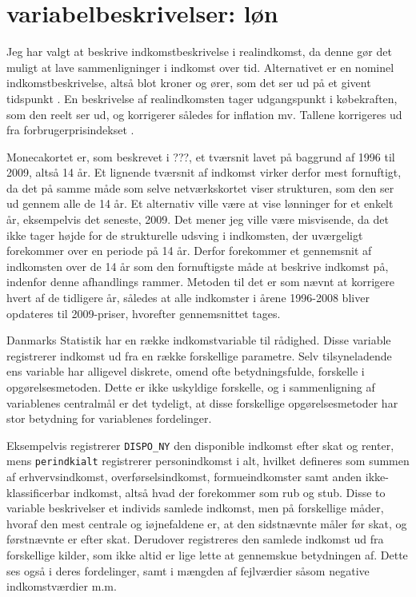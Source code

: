 
\newpage \chapter{variabelbeskrivelser: løn \label{app_loen}}

Jeg har valgt at beskrive indkomstbeskrivelse i realindkomst, da denne gør det muligt at lave sammenligninger i indkomst over tid. Alternativet er en nominel indkomstbeskrivelse, altså blot kroner og ører, som det ser ud på et givent tidspunkt \parencite[6]{DST2009}. 
En beskrivelse af realindkomsten tager udgangspunkt i købekraften, som den reelt ser ud, og korrigerer således for inflation mv. Tallene korrigeres ud fra forbrugerprisindekset \parencite{DSTPRISINDEKS}. 

Monecakortet er, som beskrevet i ???, et tværsnit lavet på baggrund af 1996 til 2009, altså 14 år. Et lignende tværsnit af indkomst virker derfor mest fornuftigt, da det på samme måde som selve netværkskortet viser strukturen, som den ser ud gennem alle de 14 år. Et alternativ ville være at vise lønninger for et enkelt år, eksempelvis det seneste, 2009. Det mener jeg ville være misvisende, da det ikke tager højde for de strukturelle udsving i indkomsten, der uværgeligt forekommer over en periode på 14 år. Derfor forekommer et gennemsnit af indkomsten over de 14 år som den fornuftigste måde at beskrive indkomst på, indenfor denne afhandlings rammer. Metoden til det er som nævnt at korrigere hvert af de tidligere år, således at alle indkomster i årene 1996-2008 bliver opdateres til 2009-priser, hvorefter gennemsnittet tages. 

Danmarks Statistik har en række indkomstvariable til rådighed. Disse variable registrerer indkomst ud fra en række forskellige parametre. Selv tilsyneladende ens variable har alligevel diskrete, omend ofte betydningsfulde, forskelle i opgørelsesmetoden. Dette er ikke uskyldige forskelle, og i sammenligning af variablenes centralmål er det tydeligt, at disse forskellige opgørelsesmetoder har stor betydning for variablenes fordelinger.

Eksempelvis registrerer \texttt{DISPO\_NY} den disponible indkomst efter skat og renter, mens \texttt{perindkialt} registrerer personindkomst i alt, hvilket defineres som summen af erhvervsindkomst, overførselsindkomst, formueindkomster samt anden ikke-klassificerbar indkomst, altså hvad der forekommer som rub og stub. Disse to variable beskrivelser et individs samlede indkomst, men på forskellige måder, hvoraf den mest centrale og iøjnefaldene er, at den sidstnævnte måler før skat, og førstnævnte er efter skat. Derudover registreres den samlede indkomst ud fra forskellige kilder, som ikke altid er lige lette at gennemskue betydningen af. Dette ses også i deres fordelinger, samt i mængden af fejlværdier såsom negative indkomstværdier m.m.

